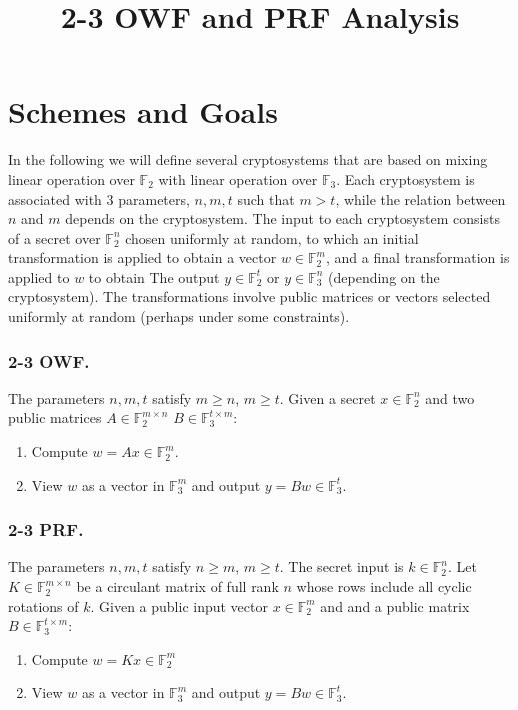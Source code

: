 \documentclass[orivec,envcountsect]{llncs}
\title{2-3 OWF and PRF Analysis}
\author{}
\institute{}
\begin{document}
\maketitle

\section{Schemes and Goals}

In the following we will define several cryptosystems that are based on mixing linear operation over
$\mathbb{F}_2$ with linear operation over $\mathbb{F}_3$.
Each cryptosystem is associated with 3 parameters, $n,m,t$ such that $m > t$,
while the relation between $n$ and $m$ depends on the cryptosystem.
The input to each cryptosystem consists of a secret over $\mathbb{F}_2^n$ chosen uniformly at random,
to which an initial transformation
is applied to obtain a vector $w \in \mathbb{F}_2^m$, and a final transformation is applied to $w$ to obtain
The output $y \in \mathbb{F}_2^t$ or $y\in \mathbb{F}_3^n$ (depending on the cryptosystem).
The transformations involve public matrices or vectors selected uniformly at random
(perhaps under some constraints).


\subsubsection{2-3 OWF.}

The parameters $n,m,t$ satisfy $m \geq n$, $m \geq t$.
Given a secret $x \in \mathbb{F}_2^n$ and
two public matrices $A \in \mathbb{F}_2^{m \times n}$
$B \in \mathbb{F}_3^{t \times m}$:
\begin{enumerate}
  \item Compute $w = Ax \in \mathbb{F}_2^m$.
  \item View $w$ as a vector in $\mathbb{F}_3^m$ and output $y = Bw \in \mathbb{F}_3^t$.
\end{enumerate}

\subsubsection{2-3 PRF.}

The parameters $n,m,t$ satisfy $n \geq m$, $m \geq t$.
The secret input is $k \in \mathbb{F}_2^{n}$.
Let $K \in \mathbb{F}_2^{m \times n}$ be a circulant matrix of full rank $n$
whose rows include all cyclic rotations of $k$.
Given a public input vector $x \in \mathbb{F}^{m}_2$ and
and a public matrix $B \in \mathbb{F}_3^{t \times m}$:
\begin{enumerate}
  \item Compute $w = Kx \in \mathbb{F}_2^m$
  \item View $w$ as a vector in $\mathbb{F}_3^m$ and output $y = Bw \in \mathbb{F}_3^t$.
\end{enumerate}
\end{document}
